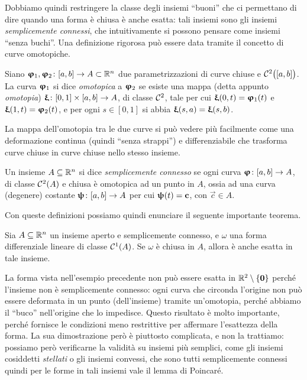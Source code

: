 Dobbiamo quindi restringere la classe degli insiemi ``buoni'' che ci permettano di dire quando una forma è chiusa è anche esatta: tali insiemi sono gli insiemi \emph{semplicemente connessi}, che intuitivamente si possono pensare come insiemi ``senza buchi''.
Una definizione rigorosa può essere data tramite il concetto di curve omotopiche.
\begin{definizione} \label{d:curva-omotopica}
	Siano $\bm{\upvarphi}_1,\bm{\upvarphi}_2\colon[a,b]\to A\subset\mathbb{R}^n$ due parametrizzazioni di curve chiuse e $\mathcal{C}^{{2}}\big([a,b]\big)$.
	La curva $\bm{\upvarphi}_1$ si dice \emph{omotopica} a $\bm{\upvarphi}_2$ se esiste una mappa (detta appunto \emph{omotopia}) $\bm{\upxi}\colon[0,1]\times[a,b]\to A$, di classe $\mathcal{C}^{{2}}$, tale per cui $\bm{\upxi}(0,t)=\bm{\upvarphi}_1(t)$ e $\bm{\upxi}(1,t)=\bm{\upvarphi}_2(t)$, e per ogni $s\in[0,1]$ si abbia $\bm{\upxi}(s,a)=\bm{\upxi}(s,b)$.
\end{definizione}
La mappa dell'omotopia tra le due curve si può vedere più facilmente come una deformazione continua (quindi ``senza strappi'') e differenziabile che trasforma curve chiuse in curve chiuse nello stesso insieme.
\begin{definizione} \label{d:insieme-semplicemente-connesso}
	Un insieme $A\subseteq\mathbb{R}^n$ si dice \emph{semplicemente connesso} se ogni curva $\bm{\upvarphi}\colon[a,b]\to A$, di classe $\mathcal{C}^{{2}}(A)$ e chiusa è omotopica ad un punto in $A$, ossia ad una curva (degenere) costante $\bm{\uppsi}\colon[a,b]\to A$ per cui $\bm{\uppsi}(t)=\mathbf{c}$, con $\vec c\in A$.
\end{definizione}
Con queste definizioni possiamo quindi enunciare il seguente importante teorema.
\begin{teorema} \label{t:poincare}
	Sia $A\subseteq\mathbb{R}^n$ un insieme aperto e semplicemente connesso, e $\omega$ una forma differenziale lineare di classe $\mathcal{C}^{{1}}(A)$.
	Se $\omega$ è chiusa in $A$, allora è anche esatta in tale insieme.
\end{teorema}
La forma vista nell'esempio precedente non può essere esatta in $\mathbb{R}^2\setminus\{\mathbf{0}\}$ perch\'e l'insieme non è semplicemente connesso: ogni curva che circonda l'origine non può essere deformata in un punto (dell'insieme) tramite un'omotopia, perch\'e abbiamo il ``buco'' nell'origine che lo impedisce.
Questo risultato è molto importante, perch\'e fornisce le condizioni meno restrittive per affermare l'esattezza della forma.
La sua dimostrazione però è piuttosto complicata, e non la trattiamo: possiamo però verificarne la validità su insiemi più semplici, come gli insiemi cosiddetti \emph{stellati} o gli insiemi convessi, che sono tutti semplicemente connessi quindi per le forme in tali insiemi vale il lemma di Poincar\'e.
